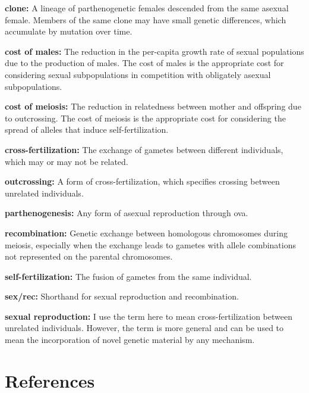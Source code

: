 \documentclass[
  letterpaper,
]{book}
\begin{document}
\textbf{clone:} A lineage of parthenogenetic females descended from the
same asexual female. Members of the same clone may have small genetic
differences, which accumulate by mutation over time.

\textbf{cost of males:} The reduction in the per-capita growth rate of
sexual populations due to the production of males. The cost of males is
the appropriate cost for considering sexual subpopulations in
competition with obligately asexual subpopulations.

\textbf{cost of meiosis:} The reduction in relatedness between mother
and offspring due to outcrossing. The cost of meiosis is the appropriate
cost for considering the spread of alleles that induce
self-fertilization.

\textbf{cross-fertilization:} The exchange of gametes between different
individuals, which may or may not be related.

\textbf{outcrossing:} A form of cross-fertilization, which specifies
crossing between unrelated individuals.

\textbf{parthenogenesis:} Any form of asexual reproduction through ova.

\textbf{recombination:} Genetic exchange between homologous chromosomes
during meiosis, especially when the exchange leads to gametes with
allele combinations not represented on the parental chromosomes.

\textbf{self-fertilization:} The fusion of gametes from the same
individual.

\textbf{sex/rec:} Shorthand for sexual reproduction and recombination.

\textbf{sexual reproduction:} I use the term here to mean
cross-fertilization between unrelated individuals. However, the term is
more general and can be used to mean the incorporation of novel genetic
material by any mechanism.


\chapter*{References}\label{references}

\end{document}
